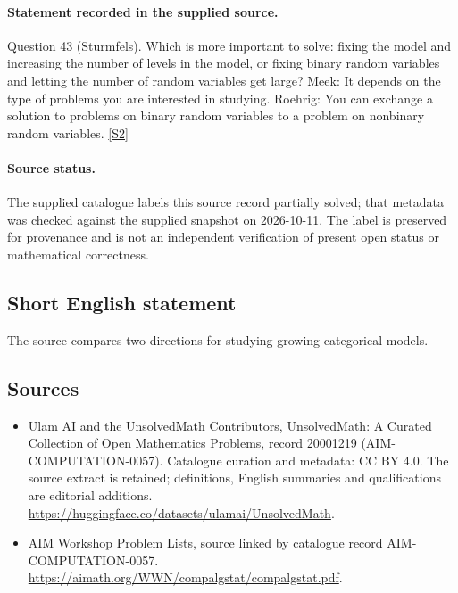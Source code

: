 \documentclass[11pt]{article}
\begin{document}
\paragraph{Statement recorded in the supplied source.}
Question 43 (Sturmfels). Which is more important to solve: fixing the model and increasing the number of levels in the model, or fixing binary random variables and letting the number of random variables get large? Meek: It depends on the type of problems you are interested in studying. Roehrig: You can exchange a solution to problems on binary random variables to a problem on nonbinary random variables. \href{https://aimath.org/WWN/compalgstat/compalgstat.pdf}{[S2]}
\paragraph{Source status.}
The supplied catalogue labels this source record partially solved; that metadata was checked against the supplied snapshot on 2026-10-11. The label is preserved for provenance and is not an independent verification of present open status or mathematical correctness.
\subsection{Short English statement}
The source compares two directions for studying growing categorical models.
\subsection{Sources}
\begin{itemize}
\item[S1] Ulam AI and the UnsolvedMath Contributors, UnsolvedMath: A Curated Collection of Open Mathematics Problems, record 20001219 (AIM-COMPUTATION-0057). Catalogue curation and metadata: CC BY 4.0. The source extract is retained; definitions, English summaries and qualifications are editorial additions.
\url{https://huggingface.co/datasets/ulamai/UnsolvedMath}.
\item[S2] AIM Workshop Problem Lists, source linked by catalogue record AIM-COMPUTATION-0057.
\url{https://aimath.org/WWN/compalgstat/compalgstat.pdf}.
\end{itemize}
\end{document}
